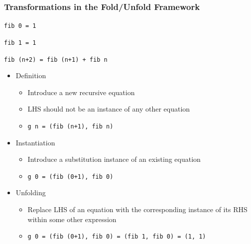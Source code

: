\documentclass{beamer}
\begin{document}
\begin{frame}[fragile]
  \frametitle{Transformations in the Fold/Unfold Framework}
\texttt{fib 0 = 1}

\texttt{fib 1 = 1}

\texttt{fib (n+2) = fib (n+1) + fib n}

\begin{itemize}
  \item Definition
  \begin{itemize}
    \item Introduce a new recursive equation
    \item LHS should not be an instance of any other equation
    \item \texttt{g n = (fib (n+1), fib n)}
  \end{itemize}
  \item Instantiation
  \begin{itemize}
    \item Introduce a substitution instance of an existing equation
    \item \texttt{g 0 = (fib (0+1), fib 0)}
  \end{itemize}
  \item Unfolding
  \begin{itemize}
    \item Replace LHS of an equation with the corresponding instance of its RHS within some other expression
    \item \texttt{g 0 = (fib (0+1), fib 0) = (fib 1, fib 0) = (1, 1)}
  \end{itemize}

\end{itemize}
\end{frame}
\end{document}
